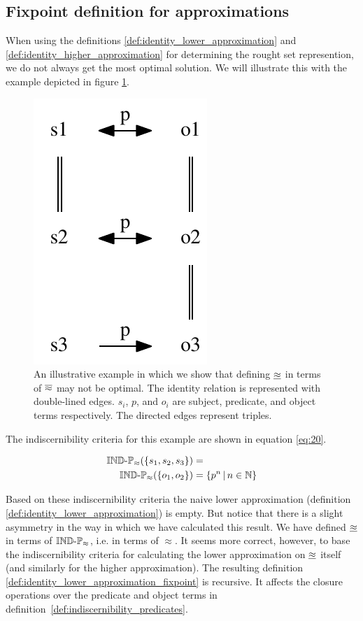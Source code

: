 \subsection{Fixpoint definition for approximations}

When using the definitions
  \ref{def:identity_lower_approximation} and
  \ref{def:identity_higher_approximation}
  for determining the rought set represention,
  we do not always get the most optimal solution.
We will illustrate this with the example depicted
  in figure \ref{fig:fixpoint}.

\begin{figure}
\label{fig:fixpoint}
\centering
\includegraphics[width=0.25\columnwidth]{./img/fixpoint_example_cropped}
\caption{
  An illustrative example in which we show that defining
  $\underline{\approx}$ in terms of $\overline{\approx}$ may not be optimal.
  The identity relation is represented with double-lined edges.
  $s_i$, $p$, and $o_i$ are subject, predicate, and object terms respectively.
  The directed edges represent triples.
}
\end{figure}

The indiscernibility criteria for this example are shown
  in equation \ref{eq:20}.

\begin{align}
\label{eq:20}
  \operatorname{{\mathbb{IND}-\mathbb{P}}}_{\approx}(\{s_1,s_2,s_3\})
&=\\
  \operatorname{{\mathbb{IND}-\mathbb{P}}}_{\approx}(\{o_1,o_2\})
&=
  \{p^n\,\vert\,n \in \mathbb{N}\}\nonumber
\end{align}

\noindent Based on these indiscernibility criteria
  the naive lower approximation
  (definition \ref{def:identity_lower_approximation}) is empty.
But notice that there is a slight asymmetry in the way in which we have
  calculated this result.
We have defined $\underline{\approx}$ in terms of $\operatorname{{\mathbb{IND}-\mathbb{P}}}_{\approx}$,
  i.e. in terms of $\approx$.
It seems more correct, however, to base the indiscernibility criteria
  for calculating the lower approximation on $\underline{\approx}$ itself
  (and similarly for the higher approximation).
The resulting definition \ref{def:identity_lower_approximation_fixpoint}
  is recursive.
It affects the closure operations over the predicate and object terms
  in \mbox{definition \ref{def:indiscernibility_predicates}}.


